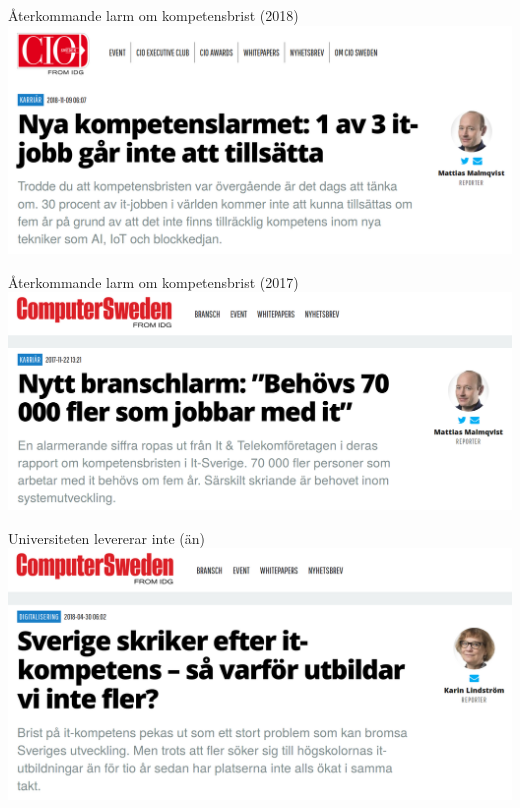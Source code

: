 \documentclass[aspectratio=169]{beamer}
\newenvironment{Slide}[1]%
  {\begin{frame}[environment=Slide]{#1}}
  {\end{frame}}%
\begin{document}
\begin{Slide}{Återkommande larm om kompetensbrist (2018)}
\includegraphics[height=0.75\textheight]{../img/kompetenslarm-cio}
\end{Slide}

\begin{Slide}{Återkommande larm om kompetensbrist (2017)}
\includegraphics[height=0.75\textheight]{../img/kompetenslarm-cs}
\end{Slide}

\begin{Slide}{Universiteten levererar inte (än)}
\includegraphics[height=0.75\textheight]{../img/utbilda-fler}
\end{Slide}
\end{document}
